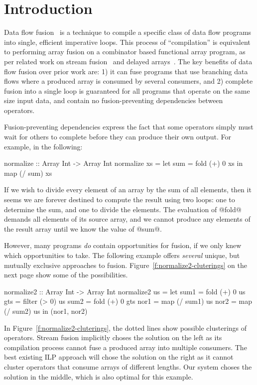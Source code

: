 \section{Introduction}

Data flow fusion~\cite{lippmeier2013flow} is a technique to compile a specific class of data flow programs into single, efficient imperative loops. This process of ``compilation'' is equivalent to performing array fusion on a combinator based functional array program, as per related work on stream fusion~\cite{coutts2007streamfusion} and delayed arrays~\cite{keller2010repa}. The key benefits of data flow fusion over prior work are: 1) it can fuse programs that use branching data flows where a produced array is consumed by several consumers, and 2) complete fusion into a single loop is guaranteed for all programs that operate on the same size input data, and contain no fusion-preventing dependencies between operators.

Fusion-preventing dependencies express the fact that some operators simply must wait for others to complete before they can produce their own output. For example, in the following:
\begin{code}
  normalize :: Array Int -> Array Int
  normalize xs = let sum = fold (+) 0 xs
                 in  map (/ sum) xs
\end{code}

If we wish to divide every element of an array by the sum of all elements, then it seems we are forever destined to compute the result using two loops: one to determine the sum, and one to divide the elements. The evaluation of @fold@ demands all elements of its source array, and we cannot produce any elements of the result array until we know the value of @sum@. 

However, many programs \emph{do} contain opportunities for fusion, if we only knew which opportunities to take. The following example offers \emph{several} unique, but mutually exclusive approaches to fusion. Figure~\ref{f:normalize2-cluterings} on the next page show some of the possibilities.
\begin{code}
 normalize2 :: Array Int -> Array Int
 normalize2 us
  = let sum1 = fold   (+)  0   us
        gts  = filter (> 0)    us
        sum2 = fold   (+)  0   gts
        nor1 = map    (/ sum1) us
        nor2 = map    (/ sum2) us
    in (nor1, nor2)
\end{code}

In Figure~\ref{f:normalize2-cluterings}, the dotted lines show possible clusterings of operators. Stream fusion implicitly choses the solution on the left as its compilation process cannot fuse a produced array into multiple consumers. The best existing ILP approach will chose the solution on the right as it cannot cluster operators that consume arrays of different lengths. Our system choses the solution in the middle, which is also optimal for this example. 

